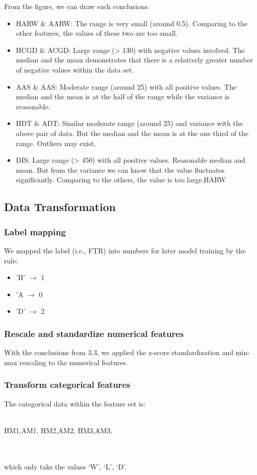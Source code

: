 \documentclass{article}
\begin{document}
From the figure, we can draw such conclusions:
\begin{itemize}
\item HARW \& AARW: The range is very small (around 0.5). Comparing to the other features, the values of these two are too small.
\item HCGD \& ACGD: Large range (> 130) with negative values involved. The median and the mean demonstrates that there is a relatively greater number of negative values within the data set.
\item AAS \& AAS: Moderate range (around 25) with all positive values. The median and the mean is at the half of the range while the variance is reasonable.
\item HDT \& ADT: Similar moderate range (around 25) and variance with the above pair of data. But the median and the mean is at the one third of the range. Outliers may exist.
\item DIS: Large range (> 450) with all positive values. Reasonable median and mean. But from the variance we can know that the value fluctuates significantly. Comparing to the others, the value is too large.HARW
\end{itemize}

\subsection{Data Transformation}
\subsubsection{Label mapping}
We mapped the label (i.e., FTR) into numbers for later model training by the rule:
\begin{itemize}
\item 'H' $\to$ 1
\item 'A $\to$ 0
\item 'D' $\to$ 2
\end{itemize}

\subsubsection{Rescale and standardize numerical features} \label{`}
With the conclusions from 3.3, we applied the z-score standardization and min-max rescaling to the numerical features.
\subsubsection{Transform categorical features}
The categorical data within the feature set is: \\\\
		\centerline{HM1,AM1, HM2,AM2, HM3,AM3, }\\\\
which only take the values {‘W’, ‘L’, ‘D’}.
\end{document}
